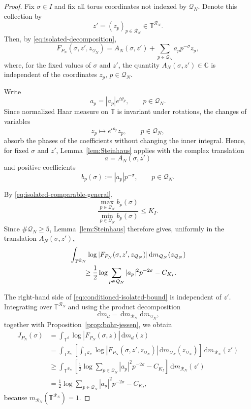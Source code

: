\documentclass[11pt]{article}
\theoremstyle{definition}
\newcommand{\C}{\mathbb C}
\newcommand{\T}{\mathbb T}
\newcommand{\dd}{\,\mathrm d}
\newcommand{\1}{\mathbf 1}
\begin{document}
\begin{proof}
	Fix $\sigma\in I$ and fix all torus coordinates not indexed by
	$\mathcal Q_N$.  Denote this collection by
	\[
	z'=(z_p)_{p\in\mathcal R_N}\in\T^{\mathcal R_N}.
	\]
	Then, by \eqref{eq:isolated-decomposition},
	\[
	F_{P_N}(\sigma,z',z_{\mathcal Q_N})
	=
	A_N(\sigma,z')
	+\sum_{p\in\mathcal Q_N}a_pp^{-\sigma}z_p,
	\]
	where, for the fixed values of $\sigma$ and $z'$, the quantity
	$A_N(\sigma,z')\in\C$ is independent of the coordinates
	$z_p$, $p\in\mathcal Q_N$.
	
	Write
	\[
	a_p=|a_p|e^{i\vartheta_p},
	\qquad p\in\mathcal Q_N.
	\]
	Since normalized Haar measure on $\T$ is invariant under rotations,
	the changes of variables
	\[
	z_p\longmapsto e^{i\vartheta_p}z_p,
	\qquad p\in\mathcal Q_N,
	\]
	absorb the phases of the coefficients without changing the inner
	integral.  Hence, for fixed $\sigma$ and $z'$, Lemma~\ref{lem:Steinhaus}
	applies with the complex translation
	\[
	a=A_N(\sigma,z')
	\]
	and positive coefficients
	\[
	b_p(\sigma):=|a_p|p^{-\sigma},
	\qquad p\in\mathcal Q_N.
	\]
	
	By \eqref{eq:isolated-comparable-general},
	\[
	\frac{\max_{p\in\mathcal Q_N}b_p(\sigma)}
	{\min_{p\in\mathcal Q_N}b_p(\sigma)}
	\le K_I.
	\]
	Since $\#\mathcal Q_N\ge5$, Lemma~\ref{lem:Steinhaus} therefore gives,
	uniformly in the translation $A_N(\sigma,z')$,
	\begin{align}
	&\int_{\T^{\mathcal Q_N}}
	\log|F_{P_N}(\sigma,z',z_{\mathcal Q_N})|
	\dd m_{\mathcal Q_N}(z_{\mathcal Q_N})\notag\\
	&\qquad\ge
	\frac12\log
	\sum_{p\in\mathcal Q_N}|a_p|^2p^{-2\sigma}
	-C_{K_I}.
	\label{eq:conditioned-isolated-bound}
	\end{align}
	
	The right-hand side of \eqref{eq:conditioned-isolated-bound} is
	independent of $z'$.  Integrating over $\T^{\mathcal R_N}$ and using
	the product decomposition
	\[
	\dd m_d
	=
	\dd m_{\mathcal R_N}\,\dd m_{\mathcal Q_N},
	\]
	together with Proposition~\ref{prop:bohr-jessen}, we obtain
	\begin{align*}
	J_{P_N}(\sigma)
	&=
	\int_{\T^d}
	\log|F_{P_N}(\sigma,z)|\dd m_d(z)\\
	&=
	\int_{\T^{\mathcal R_N}}
	\left[
	\int_{\T^{\mathcal Q_N}}
	\log|F_{P_N}(\sigma,z',z_{\mathcal Q_N})|
	\dd m_{\mathcal Q_N}(z_{\mathcal Q_N})
	\right]
	\dd m_{\mathcal R_N}(z')\\
	&\ge
	\int_{\T^{\mathcal R_N}}
	\left[
	\frac12\log
	\sum_{p\in\mathcal Q_N}|a_p|^2p^{-2\sigma}
	-C_{K_I}
	\right]
	\dd m_{\mathcal R_N}(z')\\
	&=
	\frac12\log
	\sum_{p\in\mathcal Q_N}|a_p|^2p^{-2\sigma}
	-C_{K_I},
	\end{align*}
	because $m_{\mathcal R_N}(\T^{\mathcal R_N})=1$.
\end{proof}
\end{document}
